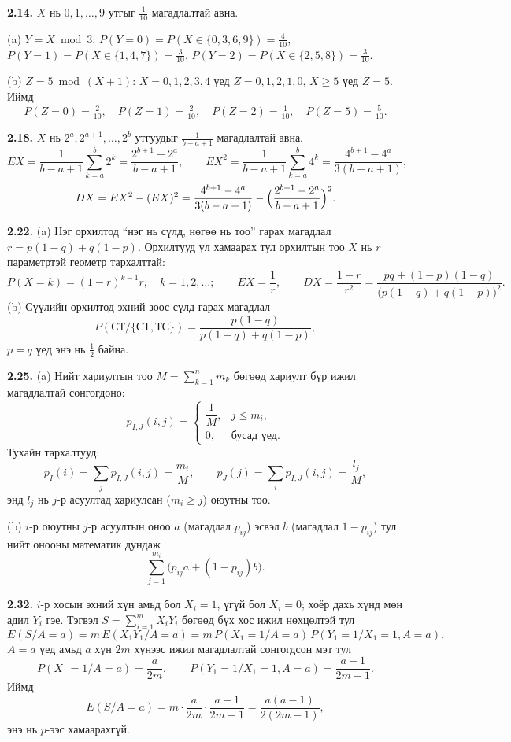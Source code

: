 \documentclass[11pt,a4paper]{article}
\newcommand{\bod}[1]{\par\medskip\noindent\textbf{#1}\quad}
\begin{document}
\bod{2.14.}
$X$ нь $0,1,\dots,9$ утгыг $\frac1{10}$ магадлалтай авна.

(a) $Y=X \bmod 3$:
$P(Y=0)=P(X\in\{0,3,6,9\})=\frac4{10}$, $P(Y=1)=P(X\in\{1,4,7\})=\frac3{10}$, $P(Y=2)=P(X\in\{2,5,8\})=\frac3{10}$.

(b) $Z=5 \bmod (X+1)$: $X=0,1,2,3,4$ үед $Z=0,1,2,1,0$, $X\ge5$ үед $Z=5$. Иймд
\[
P(Z=0)=\tfrac2{10},\quad P(Z=1)=\tfrac2{10},\quad P(Z=2)=\tfrac1{10},\quad P(Z=5)=\tfrac5{10}.
\]

\bod{2.18.}
$X$ нь $2^a,2^{a+1},\dots,2^b$ утгуудыг $\frac1{b-a+1}$ магадлалтай авна.
\[
EX=\frac1{b-a+1}\sum_{k=a}^b2^k=\frac{2^{b+1}-2^a}{b-a+1},\qquad
EX^2=\frac1{b-a+1}\sum_{k=a}^b4^k=\frac{4^{b+1}-4^a}{3(b-a+1)},
\]
\[
DX=EX^2-(EX)^2=\frac{4^{b+1}-4^a}{3(b-a+1)}-\Bigl(\frac{2^{b+1}-2^a}{b-a+1}\Bigr)^2 .
\]

\bod{2.22.}
(a) Нэг орхилтод “нэг нь сүлд, нөгөө нь тоо” гарах магадлал $r=p(1-q)+q(1-p)$. Орхилтууд үл хамаарах тул орхилтын тоо $X$ нь $r$ параметртэй геометр тархалттай:
\[
P(X=k)=(1-r)^{k-1}r,\quad k=1,2,\dots;\qquad EX=\frac1r,\qquad DX=\frac{1-r}{r^2}=\frac{pq+(1-p)(1-q)}{\bigl(p(1-q)+q(1-p)\bigr)^2}.
\]
(b) Сүүлийн орхилтод эхний зоос сүлд гарах магадлал
\[
P(\text{СТ}/\{\text{СТ},\text{ТС}\})=\frac{p(1-q)}{p(1-q)+q(1-p)},
\]
$p=q$ үед энэ нь $\frac12$ байна.

\bod{2.25.}
(a) Нийт хариултын тоо $M=\sum_{k=1}^n m_k$ бөгөөд хариулт бүр ижил магадлалтай сонгогдоно:
\[
p_{I,J}(i,j)=\begin{cases}\dfrac1M, & j\le m_i,\\[4pt] 0, & \text{бусад үед}.\end{cases}
\]
Тухайн тархалтууд:
\[
p_I(i)=\sum_jp_{I,J}(i,j)=\frac{m_i}{M},\qquad p_J(j)=\sum_ip_{I,J}(i,j)=\frac{l_j}{M},
\]
энд $l_j$ нь $j$-р асуултад хариулсан ($m_i\ge j$) оюутны тоо.

(b) $i$-р оюутны $j$-р асуултын оноо $a$ (магадлал $p_{ij}$) эсвэл $b$ (магадлал $1-p_{ij}$) тул нийт онооны математик дундаж
\[
\sum_{j=1}^{m_i}\bigl(p_{ij}a+(1-p_{ij})b\bigr).
\]

\bod{2.32.}
$i$-р хосын эхний хүн амьд бол $X_i=1$, үгүй бол $X_i=0$; хоёр дахь хүнд мөн адил $Y_i$ гэе. Тэгвэл $S=\sum_{i=1}^mX_iY_i$ бөгөөд бүх хос ижил нөхцөлтэй тул
\[
E(S/A=a)=m\,E(X_1Y_1/A=a)=m\,P(X_1=1/A=a)\,P(Y_1=1/X_1=1,A=a).
\]
$A=a$ үед амьд $a$ хүн $2m$ хүнээс ижил магадлалтай сонгогдсон мэт тул
\[
P(X_1=1/A=a)=\frac{a}{2m},\qquad P(Y_1=1/X_1=1,A=a)=\frac{a-1}{2m-1}.
\]
Иймд
\[
E(S/A=a)=m\cdot\frac{a}{2m}\cdot\frac{a-1}{2m-1}=\frac{a(a-1)}{2(2m-1)} ,
\]
энэ нь $p$-ээс хамаарахгүй.
\end{document}
